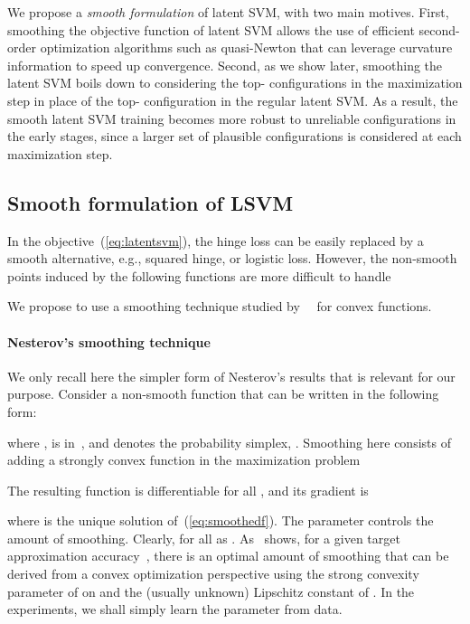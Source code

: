 \documentclass{article}
\begin{document}
We propose a \emph{smooth formulation} of latent SVM, with
 two main motives. First, smoothing the objective function of
latent SVM allows the use of efficient second-order optimization algorithms such as
quasi-Newton \cite{lbfgs} that can leverage curvature information to speed up convergence.
Second, as we show later, smoothing the latent SVM boils down to considering the
top- configurations in the maximization step in place of the top-
configuration in the regular latent SVM. As a result, the smooth latent SVM training
becomes more robust to unreliable configurations in the early stages, since a
larger set of plausible configurations is considered at each maximization step. 

\subsection{Smooth formulation of LSVM}









In the objective~(\ref{eq:latentsvm}), the hinge loss can be easily replaced by
a smooth alternative, e.g., squared hinge, or logistic loss. However, the
non-smooth points induced by the following functions are more difficult to handle

We propose to use a smoothing technique studied by~~\citet{nesterov} for convex functions.
\paragraph{Nesterov's smoothing technique}
We only recall here the
simpler form of Nesterov's results that is relevant for our purpose. 
Consider a non-smooth function that can be written in the following form:

where ,   is in~, and  denotes the probability simplex, . Smoothing here consists of 
adding a strongly convex function  in the maximization problem

The resulting function  is differentiable for all , and its gradient is

where  is the unique solution of~(\ref{eq:smoothedf}).
The parameter  controls the amount of smoothing. Clearly,  for all 
as . As~\citet{nesterov} shows, for a given target approximation accuracy~, 
there is an optimal amount of smoothing  that can be derived from a convex optimization perspective using the strong convexity parameter of  on  and the (usually unknown) Lipschitz constant of .
In the experiments, we shall simply learn
the parameter  from data. 
\end{document}
